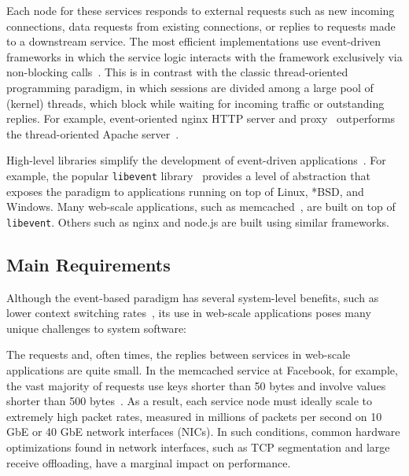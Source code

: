 Each node for these services responds to external requests such as new
incoming connections, data requests from existing connections, or
replies to requests made to a downstream service.  The most efficient
implementations use event-driven frameworks in which the service
logic interacts with the framework exclusively via non-blocking
calls~\cite{DBLP:conf/usenix/PaiDZ99,missing,missing}. This is in contrast with the classic thread-oriented
programming paradigm, in which sessions are divided among a large pool
of (kernel) threads, which block while waiting for incoming traffic or
outstanding replies. For example, event-oriented nginx HTTP server
and proxy~\cite{reese2008nginx} outperforms the thread-oriented Apache
server~\cite{misc:apache}.

High-level libraries simplify the development of event-driven
applications~\cite{provos2003libevent,libev,libuv}.  For example, the
popular \texttt{libevent} library~\cite{provos2003libevent} provides a
level of abstraction that exposes the paradigm to applications running
on top of Linux, *BSD, and Windows.  Many web-scale applications, such
as memcached~\cite{missing}, are built on top of \texttt{libevent}.  Others
such as nginx and node.js are built using similar frameworks.


\subsection{Main Requirements}
\label{sec:motivation:challenges}

Although the event-based paradigm has several system-level benefits,
such as lower context switching rates~\cite{missing}, its use in web-scale
applications poses many unique challenges to system software:

 The requests and, often times, the replies
between services in web-scale applications are quite small. In the
memcached service at Facebook, for example, the vast majority of
requests use keys shorter than 50 bytes and involve values shorter
than 500 bytes~\cite{Atikoglu:2012:WAL}. As a result, each service
node must ideally scale to extremely high packet rates, measured in
millions of packets per second on 10 GbE or 40 GbE network interfaces (NICs).
In such conditions, common hardware optimizations found in network
interfaces, such as TCP segmentation and large receive offloading,
have a marginal impact on performance. 


